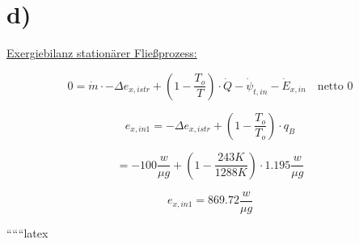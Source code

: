 

\section*{d)}

\underline{Exergiebilanz stationärer Fließprozess:}

\[
0 = \dot{m} \cdot -\Delta e_{x,istr} + \left( 1 - \frac{T_{o}}{T} \right) \cdot \dot{Q} - \dot{\psi}_{t,in} - \dot{E}_{x,in} \quad \text{netto 0}
\]

\[
e_{x,in1} = -\Delta e_{x,istr} + \left( 1 - \frac{T_{o}}{T_{o}} \right) \cdot q_{B}
\]

\[
= -100 \frac{w}{\mu g} + \left( 1 - \frac{243 K}{1288 K} \right) \cdot 1.195 \frac{w}{\mu g}
\]

\[
e_{x,in1} = 869.72 \frac{w}{\mu g}
\]

``````latex